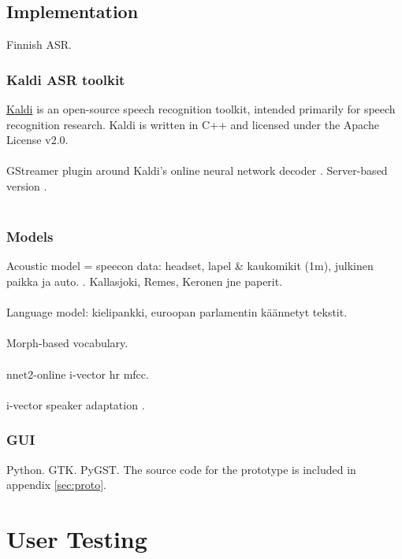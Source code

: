 \documentclass[english, 12pt, a4paper, pdftex, elec, utf8]{aaltothesis}
\begin{document}
\subsection{Implementation}

Finnish ASR.

\subsubsection{Kaldi ASR toolkit}

\href{http://kaldi-asr.org/doc/index.html}{Kaldi} is an open-source speech recognition toolkit, intended primarily for speech recognition research. Kaldi is written in C++ and licensed under the Apache License v2.0. \cite{kaldi} \\\\
GStreamer plugin around Kaldi's online neural network decoder \cite{alumae2014full}. Server-based version \cite{alumae2012open}. \\\\

\subsubsection{Models} \label{sec:models}

Acoustic model = speecon data: headset, lapel \& kaukomikit (1m), julkinen paikka ja auto. \cite[p.~43]{kallasjoki2016}. Kallasjoki, Remes, Keronen jne paperit. \\\\
Language model:  kielipankki, euroopan parlamentin käännetyt tekstit. \\\\
Morph-based vocabulary. \\\\
nnet2-online i-vector hr mfcc. \\\\
i-vector speaker adaptation \cite{xiong2016achieving, kaldi}.


\subsubsection{GUI}

Python. GTK. PyGST. The source code for the prototype is included in appendix \ref{sec:proto}.

\clearpage

\section{User Testing} \label{sec:testing}
\end{document}
